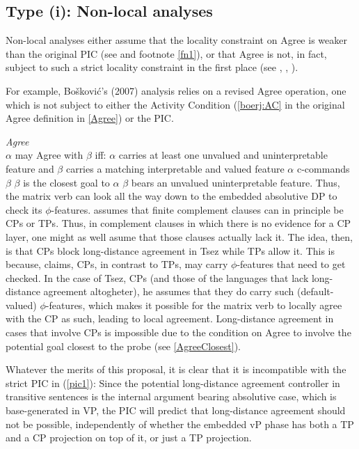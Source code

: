 \documentclass[output=paper
,modfonts
,nonflat]{langsci/langscibook}
\begin{document}
	\subsection{Type (i): Non-local analyses}
	
	Non-local analyses either assume that the locality constraint on Agree
	is weaker than the original PIC (see \citealt{Chomsky:01} and footnote
	\ref{fn1}), or that Agree is not, in fact, subject to such a strict
	locality constraint in the first place (see \citealt{Sells:06}, \citealt{Boskovic:07},
	\citealt{Keine:16}).
	
	For example, Bo\v{s}kovi{\'c}'s (2007) analysis relies on a revised
	Agree operation, one which is not subject to either the  Activity
	Condition (\ref{boerj:AC} in the original Agree definition in
	\ref{Agree}) or the PIC. 
	
	\ea\label{ex:mueller:7} \label{Agree}{\itshape Agree}\\ $\alpha$ may Agree with $\beta$ iff:
	\ea  $\alpha$ carries at least one unvalued and uninterpretable
	feature and $\beta$ carries a matching interpretable and valued
	feature 
	\ex  $\alpha$ c-commands $\beta$
	\ex \label{AgreeClosest}$\beta$ is the closest goal to $\alpha$
	\ex \label{boerj:AC}$\beta$ bears an unvalued uninterpretable feature.
	\z
	\z
	Thus, the matrix verb can look all the way
	down to the embedded absolutive DP to check its
	$\phi$-features. \citet{Boskovic:07} assumes that finite complement
	clauses can in principle be CPs or TPs. Thus, in complement clauses in
	which there is no evidence for a CP layer, one might as well asume
	that those clauses actually lack it.
	The idea, then, is that CPs block long-distance agreement in Tsez while TPs allow it. This
	is because, \citet{Boskovic:07} claims, CPs, in contrast to TPs,
	may carry $\phi$-features that need to get checked. In the case of Tsez,
	CPs (and those of the languages that lack long-distance agreement altogheter), he assumes
	that they do carry such (default-valued) $\phi$-features, which makes it possible for
	the matrix verb to locally agree with the CP as such, leading to local
	agreement. Long-distance agreement in cases that involve CPs is impossible due to the
	condition on Agree to involve the potential goal closest to the probe
	(see \ref{AgreeClosest}).
	
	Whatever the merits of this proposal, it is clear that it is
	incompatible with the strict PIC in (\ref{pic1}): 
	Since the potential long-distance agreement controller  in
	transitive sentences is the internal argument bearing absolutive case, which is base-generated
	in VP, the PIC will predict that long-distance agreement should not be
	possible, independently of whether the embedded vP phase has both a TP
	and a CP projection on top of it, or just a TP projection. 
	
\end{document}
